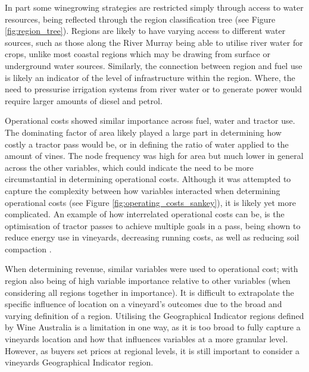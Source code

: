 \documentclass[review,12pt,authoryear]{elsarticle}
\begin{document}
\begin{linenumbers}
\par
In part some winegrowing strategies are restricted simply through access to water resources, being reflected through the region classification tree (see Figure \ref{fig:region_tree}). Regions are likely to have varying access to different water sources, such as those along the River Murray being able to utilise river water for crops, unlike most coastal regions which may be drawing from surface or underground water sources. Similarly, the connection between region and fuel use is likely an indicator of the level of infrastructure within the region. Where, the need to pressurise irrigation systems from river water or to generate power would require larger amounts of diesel and petrol.
\par
Operational costs showed similar importance across fuel, water and tractor use. The dominating factor of area likely played a large part in determining how costly a tractor pass would be, or in defining the ratio of water applied to the amount of vines. The node frequency was high for area but much lower in general across the other variables, which could indicate the need to be more circumstantial in determining operational costs. Although it was attempted to capture the complexity between how variables interacted when determining operational costs (see Figure \ref{fig:operating_costs_sankey}), it is likely yet more complicated. An example of how interrelated operational costs can be, is 
the optimisation of tractor passes to achieve multiple goals in a pass, being shown to reduce energy use in vineyards, decreasing running costs, as well as reducing soil compaction \citep{capelloEffectsTractorPasses2019}. 
\par
When determining revenue, similar variables were used to operational cost; with region also being of high variable importance relative to other variables (when considering all regions together in importance). It is difficult to extrapolate the specific influence of location on a vineyard's outcomes due to the broad and varying definition of a region. Utilising the Geographical Indicator regions defined by Wine Australia \citep{wineaustraliaWineAustraliaOpenData2021} is a limitation in one way, as it is too broad to fully capture a vineyards location and how that influences variables at a more granular level. However, as buyers set prices at regional levels, it is still important to consider a vineyards Geographical Indicator region. 

\end{linenumbers}
\end{document}

